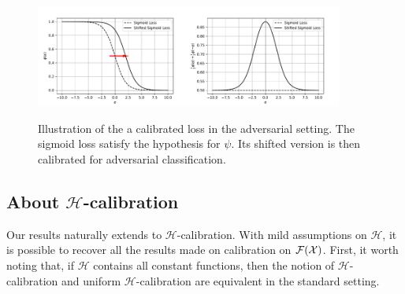 



    
    



\begin{figure}
    \centering
    \includegraphics[width = 0.45\textwidth]{sections/3_calibration/images/calibrated_loss.pdf}\includegraphics[width = 0.45\textwidth]{sections/3_calibration/images/calibrated_loss_ass.pdf}
    \caption{Illustration of the a calibrated loss in the adversarial setting. The sigmoid loss satisfy the hypothesis for $\psi$. Its shifted version is then calibrated for adversarial classification.}
    \label{fig:cal}
\end{figure}






\subsection{About $\mathcal{H}$-calibration}
\label{sec:hcal}
Our results naturally extends to $\mathcal{H}$-calibration. With mild assumptions on $\mathcal{H}$, it is possible to recover all the results made on calibration on $\mathcal{F}(\mathcal{X})$. First, it worth noting that, if $\mathcal{H}$ contains all constant functions, then the notion of $\mathcal{H}$-calibration and uniform $\mathcal{H}$-calibration are equivalent in the standard setting.




